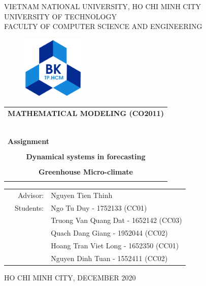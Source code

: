 \documentclass[a4paper]{article}
\begin{document}
\begin{titlepage}
\begin{center}
VIETNAM NATIONAL UNIVERSITY, HO CHI MINH CITY \\
UNIVERSITY OF TECHNOLOGY \\
FACULTY OF COMPUTER SCIENCE AND ENGINEERING
\end{center}

\vspace{1cm}

\begin{figure}[h!]
\begin{center}
\includegraphics[width=3cm]{Image/hcmut.png}
\end{center}
\end{figure}

\vspace{1cm}


\begin{center}
\begin{tabular}{c}
\multicolumn{1}{l}{\textbf{{\Large MATHEMATICAL MODELING (CO2011)}}}\\
~~\\
\hline
\\
\multicolumn{1}{l}{\textbf{{\Large Assignment}}}\\
\\
\textbf{{\Huge Dynamical systems in forecasting}}\\
\\
\textbf{{\Huge Greenhouse Micro-climate}}\\
\\
\hline
\end{tabular}
\end{center}

\vspace{3cm}

\begin{table}[h]
\begin{tabular}{rrl}
\hspace{5 cm} & Advisor: & Nguyen Tien Thinh\\
& Students: & Ngo Tu Duy - 1752133 (CC01) \\
& & Truong Van Quang Dat - 1652142 (CC03) \\
& & Quach Dang Giang - 1952044 (CC02) \\
& & Hoang Tran Viet Long - 1652350 (CC01)\\
& & Nguyen Dinh Tuan - 1552411 (CC02)\\
\end{tabular}
\end{table}

\begin{center}
{\footnotesize HO CHI MINH CITY, DECEMBER 2020}
\end{center}
\end{titlepage}
\end{document}
